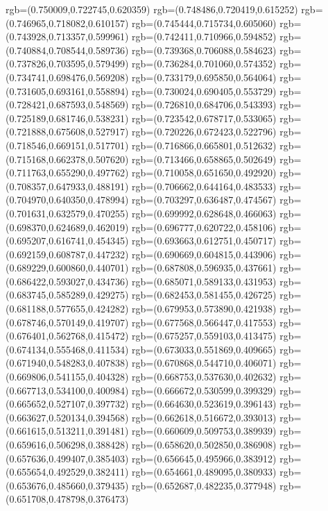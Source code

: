 {{{			rgb=(0.750009,0.722745,0.620359)
			rgb=(0.748486,0.720419,0.615252)
			rgb=(0.746965,0.718082,0.610157)
			rgb=(0.745444,0.715734,0.605060)
			rgb=(0.743928,0.713357,0.599961)
			rgb=(0.742411,0.710966,0.594852)
			rgb=(0.740884,0.708544,0.589736)
			rgb=(0.739368,0.706088,0.584623)
			rgb=(0.737826,0.703595,0.579499)
			rgb=(0.736284,0.701060,0.574352)
			rgb=(0.734741,0.698476,0.569208)
			rgb=(0.733179,0.695850,0.564064)
			rgb=(0.731605,0.693161,0.558894)
			rgb=(0.730024,0.690405,0.553729)
			rgb=(0.728421,0.687593,0.548569)
			rgb=(0.726810,0.684706,0.543393)
			rgb=(0.725189,0.681746,0.538231)
			rgb=(0.723542,0.678717,0.533065)
			rgb=(0.721888,0.675608,0.527917)
			rgb=(0.720226,0.672423,0.522796)
			rgb=(0.718546,0.669151,0.517701)
			rgb=(0.716866,0.665801,0.512632)
			rgb=(0.715168,0.662378,0.507620)
			rgb=(0.713466,0.658865,0.502649)
			rgb=(0.711763,0.655290,0.497762)
			rgb=(0.710058,0.651650,0.492920)
			rgb=(0.708357,0.647933,0.488191)
			rgb=(0.706662,0.644164,0.483533)
			rgb=(0.704970,0.640350,0.478994)
			rgb=(0.703297,0.636487,0.474567)
			rgb=(0.701631,0.632579,0.470255)
			rgb=(0.699992,0.628648,0.466063)
			rgb=(0.698370,0.624689,0.462019)
			rgb=(0.696777,0.620722,0.458106)
			rgb=(0.695207,0.616741,0.454345)
			rgb=(0.693663,0.612751,0.450717)
			rgb=(0.692159,0.608787,0.447232)
			rgb=(0.690669,0.604815,0.443906)
			rgb=(0.689229,0.600860,0.440701)
			rgb=(0.687808,0.596935,0.437661)
			rgb=(0.686422,0.593027,0.434736)
			rgb=(0.685071,0.589133,0.431953)
			rgb=(0.683745,0.585289,0.429275)
			rgb=(0.682453,0.581455,0.426725)
			rgb=(0.681188,0.577655,0.424282)
			rgb=(0.679953,0.573890,0.421938)
			rgb=(0.678746,0.570149,0.419707)
			rgb=(0.677568,0.566447,0.417553)
			rgb=(0.676401,0.562768,0.415472)
			rgb=(0.675257,0.559103,0.413475)
			rgb=(0.674134,0.555468,0.411534)
			rgb=(0.673033,0.551869,0.409665)
			rgb=(0.671940,0.548283,0.407838)
			rgb=(0.670868,0.544710,0.406071)
			rgb=(0.669806,0.541155,0.404328)
			rgb=(0.668753,0.537630,0.402632)
			rgb=(0.667713,0.534100,0.400984)
			rgb=(0.666672,0.530599,0.399329)
			rgb=(0.665652,0.527107,0.397732)
			rgb=(0.664630,0.523619,0.396143)
			rgb=(0.663627,0.520134,0.394568)
			rgb=(0.662618,0.516672,0.393013)
			rgb=(0.661615,0.513211,0.391481)
			rgb=(0.660609,0.509753,0.389939)
			rgb=(0.659616,0.506298,0.388428)
			rgb=(0.658620,0.502850,0.386908)
			rgb=(0.657636,0.499407,0.385403)
			rgb=(0.656645,0.495966,0.383912)
			rgb=(0.655654,0.492529,0.382411)
			rgb=(0.654661,0.489095,0.380933)
			rgb=(0.653676,0.485660,0.379435)
			rgb=(0.652687,0.482235,0.377948)
			rgb=(0.651708,0.478798,0.376473)
}}}
